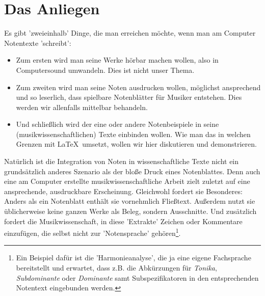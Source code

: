 %
%
%



\section{Das Anliegen}

Es gibt 'zweieinhalb' Dinge, die man erreichen möchte, wenn man am Computer
Notentexte 'schreibt':

\begin{itemize}
  \item Zum ersten wird man seine Werke hörbar machen wollen, also in
  Computersound umwandeln. Dies ist nicht unser Thema.
  \item Zum zweiten wird man seine Noten ausdrucken wollen, möglichst
  ansprechend und so leserlich, dass spielbare Notenblätter für Musiker
  entstehen. Dies werden wir allenfalls mittelbar behandeln.
  \item Und schließlich wird der eine oder andere Notenbeispiele in seine
  (musikwissenschaftlichen) Texte einbinden wollen. Wie man das in welchen
  Grenzen mit \LaTeX\ umsetzt, wollen wir hier diskutieren und demonstrieren.
\end{itemize}

Natürlich ist die Integration von Noten in wissenschaftliche Texte nicht ein
grundsätzlich anderes Szenario als der bloße Druck eines Notenblattes.
Denn auch eine am Computer erstellte musikwissenschaftliche Arbeit zielt zuletzt
auf eine ansprechende, ausdruckbare Erscheinung. Gleichwohl fordert sie
Besonderes: Anders als ein Notenblatt enthält sie vornehmlich Fließtext.
Außerdem nutzt sie üblicherweise keine ganzen Werke als Beleg, sondern
Ausschnitte. Und zusätzlich fordert die Musikwissenschaft, in diese 'Extrakte'
Zeichen oder Kommentare einzufügen, die selbst nicht zur 'Notensprache'
gehören\footnote{Ein Beispiel dafür ist die 'Harmonieanalyse', die ja eine
eigene Fachsprache bereitstellt und erwartet, dass z.B. die Abkürzungen für
\textit{Tonika}, \textit{Subdominante} oder \textit{Dominante} samt Subspezifikatoren
in den entsprechenden Notentext eingebunden werden.}.

